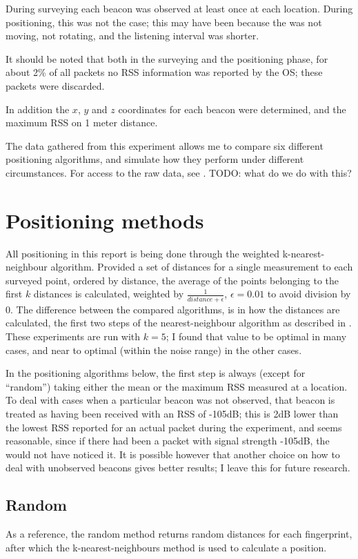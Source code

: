 During surveying each beacon was observed at least once at each location.
During positioning, this was not the case; this may have been because the \device was not moving, not rotating, and the listening interval was shorter.

It should be noted that both in the surveying and the positioning phase, for about 2\% of all packets no RSS information was reported by the OS; these packets were discarded.

In addition the $x$, $y$ and $z$ coordinates for each beacon were determined, and the maximum RSS on 1 meter distance.

The data gathered from this experiment allows me to compare six different positioning algorithms, and simulate how they perform under different circumstances.
For access to the raw data, see . TODO: what do we do with this?

\section{Positioning methods}

All positioning in this report is being done through the weighted k-nearest-neighbour algorithm.
Provided a set of distances for a single measurement to each surveyed point, ordered by distance, the average of the points belonging to the first $k$ distances is calculated, weighted by $\frac{1}{distance+\epsilon}$, $\epsilon=0.01$ to avoid division by 0.
The difference between the compared algorithms, is in how the distances are calculated, the first two steps of the nearest-neighbour algorithm as described in .
These experiments are run with $k = 5$; I found that value to be optimal in many cases, and near to optimal (within the noise range) in the other cases.

In the positioning algorithms below, the first step is always (except for ``random'') taking either the mean or the maximum RSS measured at a location.
To deal with cases when a particular beacon was not observed, that beacon is treated as having been received with an RSS of -105dB; this is 2dB lower than the lowest RSS reported for an actual packet during the experiment, and seems reasonable, since if there had been a packet with signal strength -105dB, the \device would not have noticed it.
It is possible however that another choice on how to deal with unobserved beacons gives better results; I leave this for future research.

\subsection{Random}
As a reference, the random method returns random distances for each fingerprint, after which the k-nearest-neighbours method is used to calculate a position.

